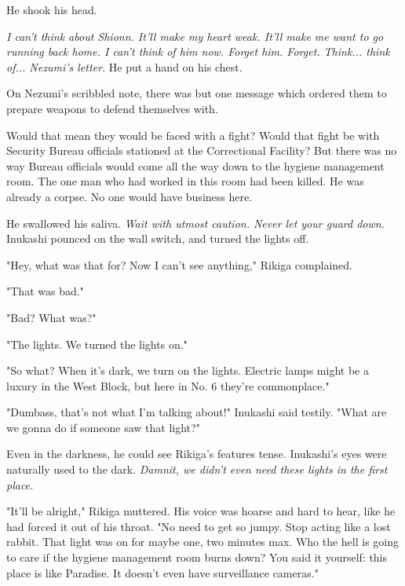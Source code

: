 He shook his head.

\emph{I can't think about Shionn. It'll make my heart weak. It'll make me want
to go running back home. I can't think of him now. Forget him. Forget.
Think... think of... Nezumi's letter.} He put a hand on his chest.

On Nezumi's scribbled note, there was but one message which ordered them
to prepare weapons to defend themselves with.


Would that mean they would be faced with a fight? Would that fight be
with Security Bureau officials stationed at the Correctional Facility?
But there was no way Bureau officials would come all the way down to the
hygiene management room. The one man who had worked in this room had
been killed. He was already a corpse. No one would have business here.

He swallowed his saliva. \emph{Wait with utmost caution. Never let your guard
down.} Inukashi pounced on the wall switch, and turned the lights off.

"Hey, what was that for? Now I can't see anything," Rikiga complained.

"That was bad."

"Bad? What was?"

"The lights. We turned the lights on."

"So what? When it's dark, we turn on the lights. Electric lamps might be
a luxury in the West Block, but here in No. 6 they're commonplace."

"Dumbass, that's not what I'm talking about!" Inukashi said testily.
"What are we gonna do if someone saw that light?"

Even in the darkness, he could see Rikiga's features tense. Inukashi's
eyes were naturally used to the dark. \emph{Damnit, we didn't even need these
lights in the first place.}

"It'll be alright," Rikiga muttered. His voice was hoarse and hard to
hear, like he had forced it out of his throat. "No need to get so jumpy.
Stop acting like a lost rabbit. That light was on for maybe one, two
minutes max. Who the hell is going to care if the hygiene management
room burns down? You said it yourself: this place is like Paradise. It
doesn't even have surveillance cameras."

